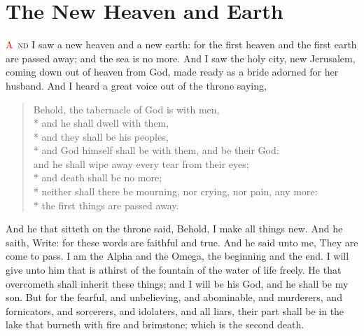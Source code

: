 
\chapter{The New Heaven and Earth}
\lettrine[lines=3,slope=0.5em]{\textcolor{red}{A}}{\ nd} I saw a new heaven and a new earth: for the first heaven and the first earth are passed away; and the sea is no more. 
 And I saw the holy city, new Jerusalem, coming down out of heaven from God, made ready as a bride adorned for her husband. 
 And I heard a great voice out of the throne saying,
\begin{verse}
Behold, the tabernacle of God is with men,\\*\vin
and he shall dwell with them,\\*\vin
and they shall be his peoples,\\*\vin
and God himself shall be with them, and be their God:\\
and he shall wipe away every tear from their eyes;\\*\vin
and death shall be no more;\\*\vin
neither shall there be mourning, nor crying, nor pain, any more:\\*\vin
the first things are passed away.
\end{verse}

 And he that sitteth on the throne said, Behold, I make all things new. And he saith, Write: for these words are faithful and true. 
 And he said unto me, They are come to pass. I am the Alpha and the Omega, the beginning and the end. I will give unto him that is athirst of the fountain of the water of life freely. 
 He that overcometh shall inherit these things; and I will be his God, and he shall be my son. 
 But for the fearful, and unbelieving, and abominable, and murderers, and fornicators, and sorcerers, and idolaters, and all liars, their part shall be in the lake that burneth with fire and brimstone; which is the second death.

